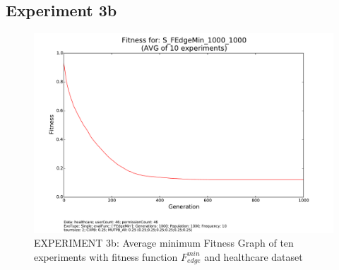     
\subsection{Experiment 3b}
    \begin{figure}[H]
        \centering
        \includegraphics[scale=0.4, trim=0cm 2cm 0cm 0cm, clip=true]{./Figures/exp3bFitness}
        \caption{EXPERIMENT 3b: Average minimum Fitness Graph of ten experiments with fitness function $F_{edge}^{min}$ and healthcare dataset}
    \label{fig:exp3bfitness}
    \end{figure}

    
